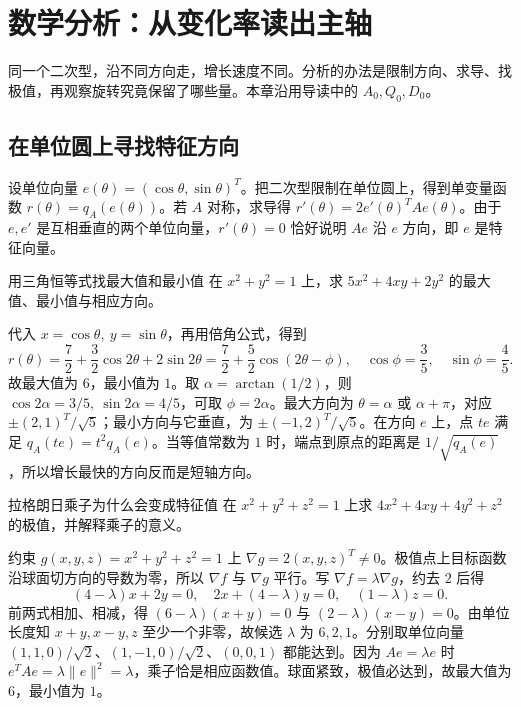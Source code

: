 \chapter{数学分析：从变化率读出主轴}
\label{ch:calculus}

同一个二次型，沿不同方向走，增长速度不同。分析的办法是限制方向、求导、找极值，再观察旋转究竟保留了哪些量。本章沿用导读中的 $A_0,Q_0,D_0$。

\section{在单位圆上寻找特征方向}

设单位向量 $e(\theta)=(\cos\theta,\sin\theta)^T$。把二次型限制在单位圆上，得到单变量函数 $r(\theta)=q_A(e(\theta))$。若 $A$ 对称，求导得 $r'(\theta)=2e'(\theta)^TAe(\theta)$。由于 $e,e'$ 是互相垂直的两个单位向量，$r'(\theta)=0$ 恰好说明 $Ae$ 沿 $e$ 方向，即 $e$ 是特征向量。

\begin{example}{用三角恒等式找最大值和最小值}
在 $x^2+y^2=1$ 上，求 $5x^2+4xy+2y^2$ 的最大值、最小值与相应方向。
\end{example}
\begin{solution}
代入 $x=\cos\theta,\ y=\sin\theta$，再用倍角公式，得到
\[
r(\theta)=\frac72+\frac32\cos2\theta+2\sin2\theta
         =\frac72+\frac52\cos(2\theta-\phi),
\quad \cos\phi=\frac35,\quad\sin\phi=\frac45.
\]
故最大值为 $6$，最小值为 $1$。取 $\alpha=\arctan(1/2)$，则 $\cos2\alpha=3/5,\ \sin2\alpha=4/5$，可取 $\phi=2\alpha$。最大方向为 $\theta=\alpha$ 或 $\alpha+\pi$，对应 $\pm(2,1)^T/\sqrt5$；最小方向与它垂直，为 $\pm(-1,2)^T/\sqrt5$。在方向 $e$ 上，点 $te$ 满足 $q_A(te)=t^2q_A(e)$。当等值常数为 $1$ 时，端点到原点的距离是 $1/\sqrt{q_A(e)}$，所以增长最快的方向反而是短轴方向。
\end{solution}

\begin{example}{拉格朗日乘子为什么会变成特征值}
在 $x^2+y^2+z^2=1$ 上求 $4x^2+4xy+4y^2+z^2$ 的极值，并解释乘子的意义。
\end{example}
\begin{solution}
约束 $g(x,y,z)=x^2+y^2+z^2=1$ 上 $\nabla g=2(x,y,z)^T\ne0$。极值点上目标函数沿球面切方向的导数为零，所以 $\nabla f$ 与 $\nabla g$ 平行。写 $\nabla f=\lambda\nabla g$，约去 $2$ 后得
\[
(4-\lambda)x+2y=0,\quad 2x+(4-\lambda)y=0,\quad(1-\lambda)z=0.
\]
前两式相加、相减，得 $(6-\lambda)(x+y)=0$ 与 $(2-\lambda)(x-y)=0$。由单位长度知 $x+y,x-y,z$ 至少一个非零，故候选 $\lambda$ 为 $6,2,1$。分别取单位向量 $(1,1,0)/\sqrt2$、$(1,-1,0)/\sqrt2$、$(0,0,1)$ 都能达到。因为 $Ae=\lambda e$ 时 $e^TAe=\lambda\|e\|^2=\lambda$，乘子恰是相应函数值。球面紧致，极值必达到，故最大值为 $6$，最小值为 $1$。
\end{solution}

